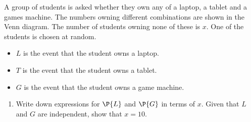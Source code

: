 \begin{problem}
    \begin{center}
    \end{center}

    A group of students is asked whether they own any of a laptop, a tablet and a games machine. The numbers owning different combinations are shown in the Venn diagram. The number of students owning none of these is $x$. One of the students is chosen at random.
    
    \begin{itemize}
        \item $L$ is the event that the student owns a laptop.
        \item $T$ is the event that the student owns a tablet.
        \item $G$ is the event that the student owns a game machine.
    \end{itemize}

    \begin{enumerate}
        \item Write down expressions for $\P{L}$ and $\P{G}$ in terms of $x$. Given that $L$ and $G$ are independent, show that $x = 10$.
    \end{enumerate}


\end{problem}
